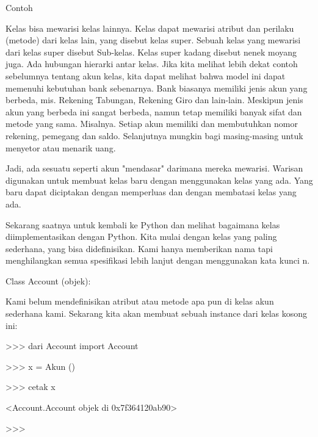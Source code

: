 \begin{12pt}
\begin{12pt}
\begin{12pt}
\begin{12pt}
\begin{12pt}
\begin{12pt}
\begin{12pt}
\begin{12pt}
\begin{12pt}
\begin{12pt}
\begin{12pt}
\begin{12pt}
\begin{12pt}
\begin{12pt}
\begin{12pt}
\begin{12pt}
\begin{12pt}
\begin{12pt}
\begin{12pt}
\vspace{12pt}
Contoh \par
\vspace{12pt}
Kelas bisa mewarisi kelas lainnya. Kelas dapat mewarisi atribut dan perilaku (metode) dari kelas lain, yang disebut kelas super. Sebuah kelas yang mewarisi dari kelas super disebut Sub-kelas. Kelas super kadang disebut nenek moyang juga. Ada hubungan hierarki antar kelas. Jika kita melihat lebih dekat contoh sebelumnya tentang akun kelas, kita dapat melihat bahwa model ini dapat memenuhi kebutuhan bank sebenarnya. Bank biasanya memiliki jenis akun yang berbeda, mis. Rekening Tabungan, Rekening Giro dan lain-lain. Meskipun jenis akun yang berbeda ini sangat berbeda, namun tetap memiliki banyak sifat dan metode yang sama. Misalnya. Setiap akun memiliki dan membutuhkan nomor rekening, pemegang dan saldo. Selanjutnya mungkin bagi masing-masing untuk menyetor atau menarik uang. \par
Jadi, ada sesuatu seperti akun "mendasar" darimana mereka mewarisi. Warisan digunakan untuk membuat kelas baru dengan menggunakan kelas yang ada. Yang baru dapat diciptakan dengan memperluas dan dengan membatasi kelas yang ada. \par
Sekarang saatnya untuk kembali ke Python dan melihat bagaimana kelas diimplementasikan dengan Python. Kita mulai dengan kelas yang paling sederhana, yang bisa didefinisikan. Kami hanya memberikan nama tapi menghilangkan semua spesifikasi lebih lanjut dengan menggunakan kata kunci n. \par
\vspace{12pt}
\noindent 
Class Account (objek): \par
\vspace{12pt}
\noindent 
Kami belum mendefinisikan atribut atau metode apa pun di kelas akun sederhana kami. Sekarang kita akan membuat sebuah instance dari kelas kosong ini: \par
\vspace{12pt}
\vspace{12pt}
\vspace{12pt}
\vspace{12pt}
\noindent 
>>> dari Account import Account \par
\noindent 
>>> x = Akun () \par
\noindent 
>>> cetak x \par
\noindent 
<Account.Account objek di 0x7f364120ab90> \par
\noindent 
>>> \par
\vspace{12pt}

\end{12pt}
\end{12pt}
\end{12pt}
\end{12pt}
\end{12pt}
\end{12pt}
\end{12pt}
\end{12pt}
\end{12pt}
\end{12pt}
\end{12pt}
\end{12pt}
\end{12pt}
\end{12pt}
\end{12pt}
\end{12pt}
\end{12pt}
\end{12pt}
\end{12pt}
